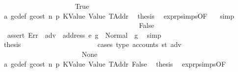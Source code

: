 \begin{isabellebody}
\ \ \ \ \ \ \ \ \ \ \ \ \ \ \ \ \ \ \ \ \isamarkupfalse%
\ True\isanewline
\ \ \ \ \ \ \ \ \ \ \ \ \ \ \ \ \ \ \ \ \isamarkupfalse%
\ a{}\ gc{\isacharunderscore}{\kern0pt}def\ gcost\ n\ p{}\ KValue\ Value\ TAddr\ \isamarkupfalse%
\ {\isacharquery}{\kern0pt}thesis\ \isamarkupfalse%
\ expr{\isachardot}{\kern0pt}psimps{\isacharparenleft}{\kern0pt}{}{}{\isacharparenright}{\kern0pt}{\isacharbrackleft}{\kern0pt}OF\ {}{}{\isacharparenleft}{\kern0pt}{}{\isacharparenright}{\kern0pt}{\isacharbrackright}{\kern0pt}\ \isamarkupfalse%
\ simp\isanewline
\ \ \ \ \ \ \ \ \ \ \ \ \ \ \ \ \ \ \isamarkupfalse%
\isanewline
\ \ \ \ \ \ \ \ \ \ \ \ \ \ \ \ \ \ \ \ \isamarkupfalse%
\ False\isanewline
\ \ \ \ \ \ \ \ \ \ \ \ \ \ \ \ \ \ \ \ \isamarkupfalse%
\ \isamarkupfalse%
\ {}{\isacharcolon}{\kern0pt}\ {\isachardoublequoteopen}assert\ Err\ {\isacharparenleft}{\kern0pt}{\isasymlambda}{\isacharunderscore}{\kern0pt}{\isachardot}{\kern0pt}\ adv\ {\isasymnoteq}\ address\ e{\isacharparenright}{\kern0pt}\ g{\isacharprime}{\kern0pt}\ {\isacharequal}{\kern0pt}\ Normal\ {\isacharparenleft}{\kern0pt}{\isacharparenleft}{\kern0pt}{\isacharparenright}{\kern0pt}{\isacharcomma}{\kern0pt}\ g{\isacharprime}{\kern0pt}{\isacharparenright}{\kern0pt}{\isachardoublequoteclose}\ \isamarkupfalse%
\ simp\isanewline
\ \ \ \ \ \ \ \ \ \ \ \ \ \ \ \ \ \ \ \ \isamarkupfalse%
\ \isamarkupfalse%
\ {\isacharquery}{\kern0pt}thesis\isanewline
\ \ \ \ \ \ \ \ \ \ \ \ \ \ \ \ \ \ \ \ \isamarkupfalse%
\ {\isacharparenleft}{\kern0pt}cases\ {\isachardoublequoteopen}type\ {\isacharparenleft}{\kern0pt}accounts\ st\ adv{\isacharparenright}{\kern0pt}{\isachardoublequoteclose}{\isacharparenright}{\kern0pt}\isanewline
\ \ \ \ \ \ \ \ \ \ \ \ \ \ \ \ \ \ \ \ \ \ \isamarkupfalse%
\ None\isanewline
\ \ \ \ \ \ \ \ \ \ \ \ \ \ \ \ \ \ \ \ \ \ \isamarkupfalse%
\ a{}\ gc{\isacharunderscore}{\kern0pt}def\ gcost\ n\ p{}\ KValue\ Value\ TAddr\ False\ \isamarkupfalse%
\ {\isacharquery}{\kern0pt}thesis\ \isamarkupfalse%
\ expr{\isachardot}{\kern0pt}psimps{\isacharparenleft}{\kern0pt}{}{}{\isacharparenright}{\kern0pt}{\isacharbrackleft}{\kern0pt}OF\ {}{}{\isacharparenleft}{\kern0pt}{}{\isacharparenright}{\kern0pt}{\isacharbrackright}{\kern0pt}\ \isamarkupfalse%

\end{isabellebody}
